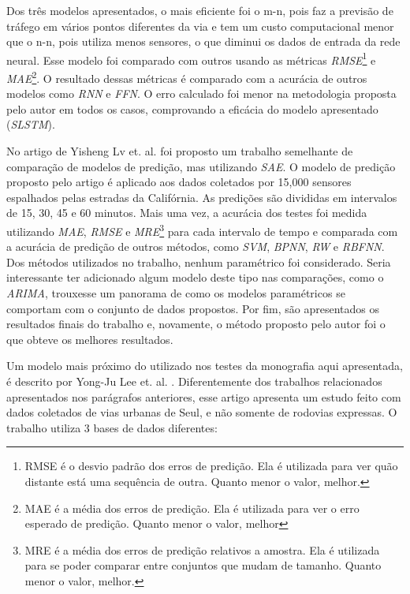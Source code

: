 Dos três modelos apresentados, o mais eficiente foi o m-n, pois faz a previsão de tráfego em vários pontos diferentes da via e tem um custo computacional menor que o n-n, pois utiliza menos sensores, o que diminui os dados de entrada da rede neural. Esse modelo foi comparado com outros usando as métricas \textit{\acrfull{RMSE}}\footnote{RMSE é o desvio padrão dos erros de predição. Ela é utilizada para ver quão distante está uma sequência de outra. Quanto menor o valor, melhor.} e \textit{\acrfull{MAE}}\footnote{MAE é a média dos erros de predição. Ela é utilizada para ver o erro esperado de predição. Quanto menor o valor, melhor}. O resultado dessas métricas é comparado com a acurácia de outros modelos como \textit{\acrshort{RNN}} e \textit{\acrfull{FFN}}. O erro calculado foi menor na metodologia proposta pelo autor em todos os casos, comprovando a eficácia do modelo apresentado (\textit{\acrshort{SLSTM}}).

No artigo de Yisheng Lv et. al. \cite{lv_6894591} foi proposto um trabalho semelhante de comparação de modelos de predição, mas utilizando \textit{\acrfull{SAE}}. O modelo de predição proposto pelo artigo é aplicado aos dados coletados por 15,000 sensores espalhados pelas estradas da Califórnia. As predições são divididas em intervalos de 15, 30, 45 e 60 minutos. Mais uma vez, a acurácia dos testes foi medida utilizando  \textit{\acrshort{MAE}}, \textit{\acrshort{RMSE}} e \textit{\acrfull{MRE}}\footnote{MRE é a média dos erros de predição relativos a amostra. Ela é utilizada para se poder comparar entre conjuntos que mudam de tamanho. Quanto menor o valor, melhor.} para cada intervalo de tempo e comparada com a acurácia de predição de outros métodos, como
\textit{\acrshort{SVM}}, \textit{\acrfull{BPNN}}, \textit{\acrfull{RW}} e \textit{\acrfull{RBFNN}}. Dos métodos utilizados no trabalho, nenhum paramétrico foi considerado. Seria interessante ter adicionado algum modelo deste tipo nas comparações, como o \textit{\acrfull{ARIMA}}, trouxesse um panorama de como os modelos paramétricos se comportam com o conjunto de dados propostos. Por fim, são apresentados os resultados finais do trabalho e, novamente, o método proposto pelo autor foi o que obteve os melhores resultados. 

Um modelo mais próximo do utilizado nos testes da monografia aqui apresentada, é descrito  por Yong-Ju Lee et. al. \cite{Seoul}. Diferentemente dos trabalhos relacionados apresentados nos parágrafos anteriores, esse artigo apresenta um estudo feito com dados coletados de vias urbanas de Seul, e não somente de rodovias expressas. O trabalho utiliza 3 bases de dados diferentes:

